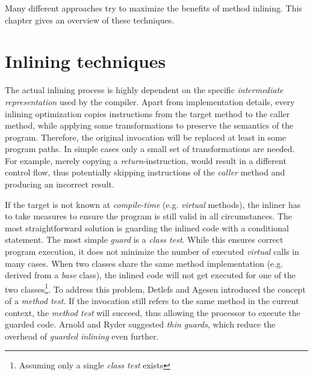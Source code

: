 \documentclass[draft, final]{vutinfth} %
\begin{document}
Many different approaches try to maximize the benefits of method inlining. This chapter gives an overview of these techniques.

\section{Inlining techniques}
\label{sec:sota-techniques}

The actual inlining process is highly dependent on the specific \emph{intermediate representation} used by the compiler. Apart from implementation details, every inlining optimization copies instructions from the target method to the caller method, while applying some transformations to preserve the semantics of the program. Therefore, the original invocation will be replaced at least in some program paths. In simple cases only a small set of transformations are needed. For example, merely copying a \emph{return}-instruction, would result in a different control flow, thus potentially skipping instructions of the \emph{caller} method and producing an incorrect result.

If the target is not known at \emph{compile-time} (e.g. \emph{virtual} methods), the inliner has to take measures to ensure the program is still valid in all circumstances. The most straightforward solution is guarding the inlined code with a conditional statement. The most simple \emph{guard} is a \emph{class test}. While this ensures correct program execution, it does not minimize the number of executed \emph{virtual} calls in many cases. When two classes share the same method implementation (e.g. derived from a \emph{base} class), the inlined code will not get executed for one of the two classes\footnote{Assuming only a single \emph{class test} exists}. To address this problem, Detlefs and Agesen introduced \cite{Detlefs99} the concept of a \emph{method test}. If the invocation still refers to the same method in the current context, the \emph{method test} will succeed, thus allowing the processor to execute the guarded code. Arnold and Ryder \cite{Arnold02} suggested \emph{thin guards}, which reduce the overhead of \emph{guarded inlining} even further.
\end{document}
